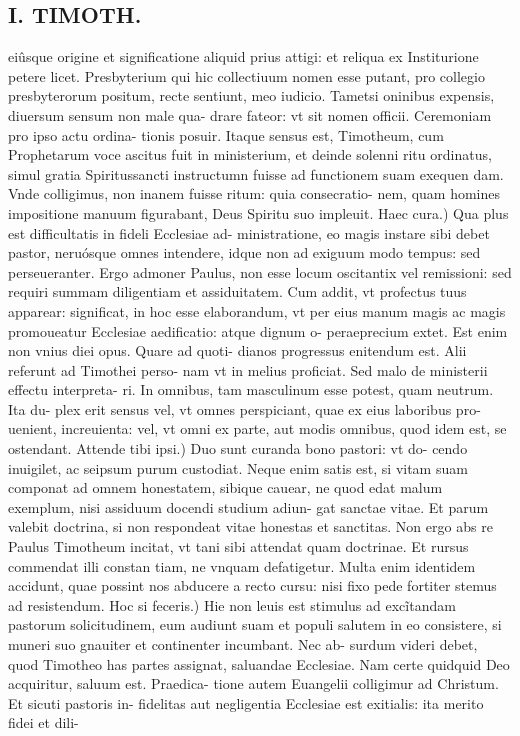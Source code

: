 \documentclass{article}
\begin{document}
\begin{pages}
\section*{I. TIMOTH. }
\marginpar{[ p.54 ]}\pstart eiûsque origine et significatione aliquid prius attigi: et reliqua ex Institurione petere licet. Presbyterium qui hic collectiuum nomen esse putant, pro collegio presbyterorum positum, recte sentiunt, meo iudicio. Tametsi oninibus expensis, diuersum sensum non male qua- drare fateor: vt sit nomen officii. Ceremoniam pro ipso actu ordina- tionis posuir. Itaque sensus est, Timotheum, cum Prophetarum voce ascitus fuit in ministerium, et deinde solenni ritu ordinatus, simul gratia Spiritussancti instructumn fuisse ad functionem suam exequen dam. Vnde colligimus, non inanem fuisse ritum: quia consecratio- nem, quam homines impositione manuum figurabant, Deus Spiritu suo impleuit.  \pend\pstart Haec cura.) Qua plus est difficultatis in fideli Ecclesiae ad- ministratione, eo magis instare sibi debet pastor, neruósque omnes intendere, idque non ad exiguum modo tempus: sed perseueranter. Ergo admoner Paulus, non esse locum oscitantix vel remissioni: sed requiri summam diligentiam et assiduitatem. Cum addit, vt profectus tuus apparear: significat, in hoc esse elaborandum, vt per eius manum magis ac magis promoueatur Ecclesiae aedificatio: atque dignum o- peraeprecium extet. Est enim non vnius diei opus. Quare ad quoti- dianos progressus enitendum est. Alii referunt ad Timothei perso- nam vt in melius proficiat. Sed malo de ministerii effectu interpreta- ri. In omnibus, tam masculinum esse potest, quam neutrum. Ita du- plex erit sensus vel, vt omnes perspiciant, quae ex eius laboribus pro- uenient, increuienta: vel, vt omni ex parte, aut modis omnibus, quod idem est, se ostendant.  \pend\pstart Attende tibi ipsi.) Duo sunt curanda bono pastori: vt do- cendo inuigilet, ac seipsum purum custodiat. Neque enim satis est, si vitam suam componat ad omnem honestatem, sibique cauear, ne quod edat malum exemplum, nisi assiduum docendi studium adiun- gat sanctae vitae. Et parum valebit doctrina, si non respondeat vitae honestas et sanctitas. Non ergo abs re Paulus Timotheum incitat, vt tani sibi attendat quam doctrinae. Et rursus commendat illi constan tiam, ne vnquam defatigetur. Multa enim identidem accidunt, quae possint nos abducere a recto cursu: nisi fixo pede fortiter stemus ad resistendum.  \pend\pstart Hoc si feceris.) Hie non leuis est stimulus ad excĩtandam pastorum solicitudinem, eum audiunt suam et populi salutem in eo consistere, si muneri suo gnauiter et continenter incumbant. Nec ab- surdum videri debet, quod Timotheo has partes assignat, saluandae Ecclesiae. Nam certe quidquid Deo acquiritur, saluum est. Praedica- tione autem Euangelii colligimur ad Christum. Et sicuti pastoris in- fidelitas aut negligentia Ecclesiae est exitialis: ita merito fidei et dili-  \pend

\end{pages}
\end{document}
